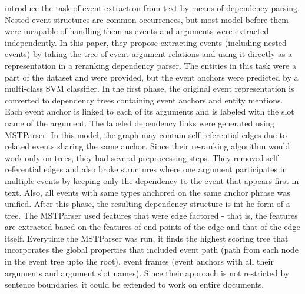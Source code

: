  introduce the task of event extraction from text by means of dependency parsing. Nested event structures are common occurrences, but most model before them were incapable of handling them as events and arguments were extracted independently. In this paper, they propose extracting events (including nested events) by taking the tree of event-argument relations and using it directly as a representation in a reranking dependency parser. The entities in this task were a part of the dataset and were provided, but the event anchors were predicted by a multi-class SVM classifier. In the first phase, the original event representation is converted to dependency trees containing event anchors and entity mentions. Each event anchor is linked to each of its arguments and is labeled with the slot name of the argument. The labeled dependency links were generated using MSTParser. In this model, the graph may contain self-referential edges due to related events sharing the same anchor. Since their re-ranking algorithm would work only on trees, they had several preprocessing steps. They removed self-referential edges and also broke structures where one argument participates in multiple events by keeping only the dependency to the event that appears first in text. Also, all events with same types anchored on the same anchor phrase was unified. After this phase, the resulting dependency structure is int he form of a tree. The MSTParser used features that were edge factored - that is, the features are extracted based on the features of end points of the edge and that of the edge itself. Everytime the MSTParser was run, it finds the highest scoring tree that incorporates the global properties that included event path (path from each node in the event tree upto the root), event frames (event anchors with all their arguments and argument slot names). Since their approach is not restricted by sentence boundaries, it could be extended to work on entire documents.


